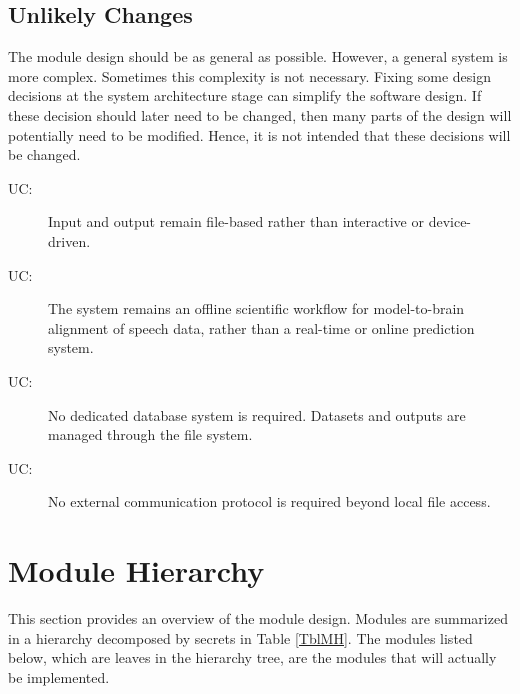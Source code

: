 \documentclass[12pt, titlepage]{article}
\newcounter{ucnum}
\newcommand{\uctheucnum}{UC\theucnum}
\begin{document}
\subsection{Unlikely Changes} \label{SecUchange}

The module design should be as general as possible. However, a general system is more complex. Sometimes this complexity is not necessary. Fixing some design decisions at the system architecture stage can simplify the software design. If these decision should later need to be changed, then many parts of the design will potentially need to be modified. Hence, it is not intended that these decisions will be changed.

\begin{description}
\item[ \uctheucnum \label{ucIO}:] Input and output remain file-based rather than interactive or device-driven.

\item[ \uctheucnum \label{ucDomain}:] The system remains an offline scientific workflow for model-to-brain alignment of speech data, rather than a real-time or online prediction system.

\item[ \uctheucnum \label{ucDB}:] No dedicated database system is required. Datasets and outputs are managed through the file system.

\item[ \uctheucnum \label{ucProtocol}:] No external
communication protocol is required beyond local file access.
\end{description}







\section{Module Hierarchy} \label{SecMH}

This section provides an overview of the module design. Modules are summarized in a hierarchy decomposed by secrets in Table \ref{TblMH}. The modules listed below, which are leaves in the hierarchy tree, are the modules that will actually be implemented.
\end{document}
